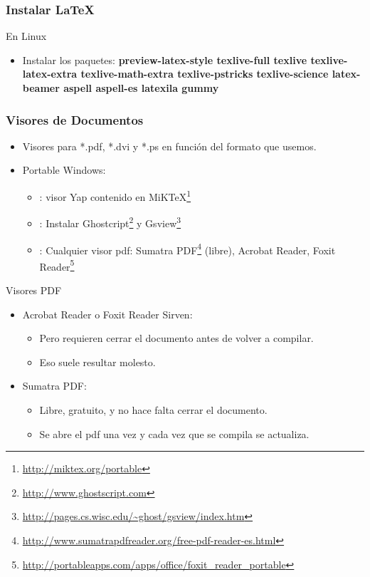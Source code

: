\documentclass[aspectratio=43]{beamer}%
\begin{document}
\begin{frame}[fragile]
\frametitle{\textbf{Instalar \LaTeX{}}}
\justifying
\begin{block}{En Linux}
 \begin{itemize}\justifying
  \item Instalar los paquetes: \textbf{preview-latex-style texlive-full texlive texlive-latex-extra texlive-math-extra texlive-pstricks texlive-science latex-beamer aspell aspell-es latexila gummy}
\end{itemize}
\end{block}
\end{frame}


\begin{frame}[fragile]
\frametitle{\textbf{Visores de Documentos}}
\justifying
 
 \begin{itemize}\justifying
  \item Visores para *.pdf, *.dvi y *.ps en función del formato que usemos.
  \item Portable Windows:
  \begin{itemize}\justifying
  \item [.dvi]: visor Yap contenido en MiK\TeX{}\footnote{\url{http://miktex.org/portable}}
  \item [.ps]: Instalar Ghostcript\footnote{\url{http://www.ghostscript.com}} y Gsview\footnote{\url{http://pages.cs.wisc.edu/~ghost/gsview/index.htm}}
  \item [.pdf]: Cualquier visor pdf: Sumatra PDF\footnote{\url{http://www.sumatrapdfreader.org/free-pdf-reader-es.html}} (libre), Acrobat Reader, Foxit Reader\footnote{\url{http://portableapps.com/apps/office/foxit_reader_portable}}
\end{itemize}
\end{itemize}
\begin{block}{Visores PDF}
\begin{itemize}\justifying
  \item Acrobat Reader o Foxit Reader Sirven:
  \begin{itemize}\justifying
  \item Pero requieren cerrar el documento antes de volver a compilar.
  \item Eso suele resultar molesto.
\end{itemize}

  \item Sumatra PDF:
  \begin{itemize}\justifying
  \item Libre, gratuito, y no hace falta cerrar el documento.
  \item Se abre el pdf una vez y cada vez que se compila se actualiza.
\end{itemize}

\end{itemize}

\end{block}

 
\end{frame}
\end{document}
